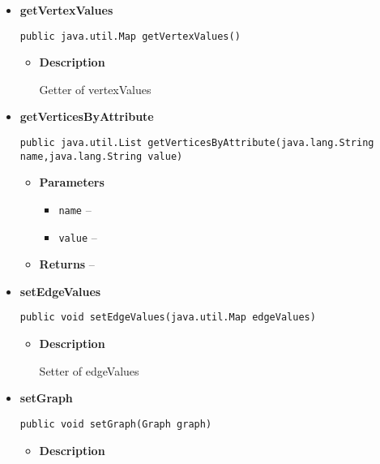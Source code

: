 {{{{{{{{{{{{{{{{\begin{itemize}
{\begin{itemize}
{Getter of graph
}
\end{itemize}
}%
\item{ 
{\bf  getVertexValues}\\
\begin{lstlisting}[frame=none]
public java.util.Map getVertexValues()\end{lstlisting} %
\begin{itemize}
\item{
{\bf  Description}

Getter of vertexValues
}
\end{itemize}
}%
\item{ 
{\bf  getVerticesByAttribute}\\
\begin{lstlisting}[frame=none]
public java.util.List getVerticesByAttribute(java.lang.String name,java.lang.String value)\end{lstlisting} %
\begin{itemize}
\item{
{\bf  Parameters}
  \begin{itemize}
   \item{
\texttt{name} -- }
   \item{
\texttt{value} -- }
  \end{itemize}
}%
\item{{\bf  Returns} -- 
 
}%
\end{itemize}
}%
\item{ 
{\bf  setEdgeValues}\\
\begin{lstlisting}[frame=none]
public void setEdgeValues(java.util.Map edgeValues)\end{lstlisting} %
\begin{itemize}
\item{
{\bf  Description}

Setter of edgeValues
}
\end{itemize}
}%
\item{ 
{\bf  setGraph}\\
\begin{lstlisting}[frame=none]
public void setGraph(Graph graph)\end{lstlisting} %
\begin{itemize}
\item{
{\bf  Description}

}
\end{itemize}}
\end{itemize}}}}}}}}}}}}}}}}}
